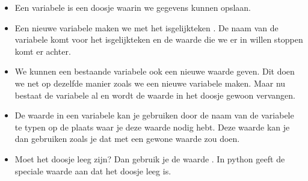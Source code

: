 \begin{itemize}
	\item
		Een variabele is een doosje waarin we gegevens kunnen opslaan.
		\begin{figure}[H]
			\centering
		\end{figure}
	\item
		\newline
		Een nieuwe variabele maken we met het isgelijkteken \pySnip{=}.
		De naam van de variabele komt voor het isgelijkteken en de waarde die we er in willen stoppen komt er achter.
	\item
		\newline
		We kunnen een bestaande variabele ook een nieuwe waarde geven.
		Dit doen we net op dezelfde manier zoals we een nieuwe variabele maken.
		Maar nu bestaat de variabele al en wordt de waarde in het doosje gewoon vervangen.
	\item
		\newline
		De waarde in een variabele kan je gebruiken door de naam van de variabele te typen
		op de plaats waar je deze waarde nodig hebt.
		Deze waarde kan je dan gebruiken zoals je dat met een gewone waarde zou doen.
	\item
		\newline
		Moet het doosje leeg zijn?
		Dan gebruik je de waarde .
		In python geeft de speciale waarde  aan dat het doosje leeg is.
\end{itemize}